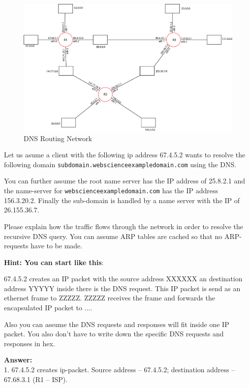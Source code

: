 \documentclass{WeSTassignment}
\begin{document}
\begin{figure}[h]
  \centering
  \includegraphics[scale=0.45]{ass3_DNS.png}
   \caption{DNS Routing Network}
     \label{fig:routing} 
\end{figure}

Let us asume a client with the following ip address 67.4.5.2 wants to resolve the following domain  \texttt{subdomain.webscienceexampledomain.com} using the DNS.

You can further assume the root name server has the IP address of 25.8.2.1 and the name-server for \texttt{webscienceexampledomain.com} has the IP address 156.3.20.2. 
Finally the sub-domain is handled by a name server with the IP of 26.155.36.7. 

Please explain how the traffic flows through the network in order to resolve the recursive DNS query. You can assume ARP tables are cached so that no ARP-requests have to be made. 

\textbf{Hint: You can start like this}: 

67.4.5.2 creates an IP packet with the source address XXXXXX an destination address YYYYY inside there is the DNS request. This IP packet is send as an ethernet frame to ZZZZZ. 
ZZZZZ receives the frame and forwards the encapsulated IP packet to ....

Also you can assume the DNS requests and responses will fit inside one IP packet. You also don't have to write down the specific DNS requests and responses in hex. 


\textbf{Answer:}\\
1. 67.4.5.2 creates ip-packet. Source address – 67.4.5.2; destination address – 67.68.3.1 (R1 – ISP).
\end{document}
